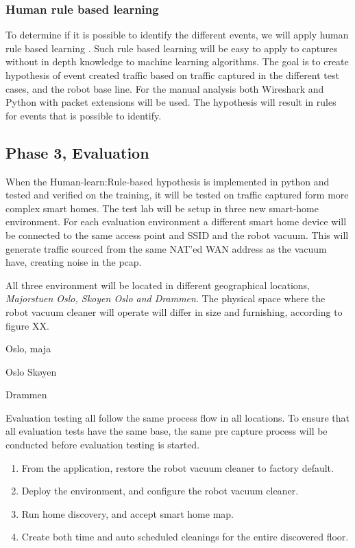 \subsubsection{Human rule based learning}
To determine if it is possible to identify the different events, we will apply human rule based learning \cite{Human-learn:Rule-based}. Such rule based learning will be easy to apply to captures without in depth knowledge to machine learning algorithms. The goal is to create hypothesis of event created traffic based on traffic captured in the different test cases, and the robot base line. For the manual analysis both Wireshark and Python with packet extensions will be used. The hypothesis will result in rules for events that is possible to identify.
 

\subsection{Phase 3, Evaluation }
When the Human-learn:Rule-based hypothesis is implemented in python and tested and verified on the training, it will be tested on traffic captured form more complex smart homes. The test lab will be setup in three new smart-home environment. For each evaluation environment a different smart home device will be connected to the same access point and SSID and the robot vacuum. This will generate traffic sourced from the same NAT'ed WAN address as the vacuum have, creating noise in the pcap.

All three environment will be located in different geographical locations, \textit{Majorstuen Oslo, Skoyen Oslo and Drammen}. The physical space where the robot vacuum cleaner will operate will differ in size and furnishing, according to figure XX. 

Oslo, maja 

Oslo Skøyen 

Drammen

Evaluation testing all follow the same process flow in all locations. To ensure that all evaluation tests have the same base, the same pre capture process will be conducted before evaluation testing is started. 

\begin{enumerate}
\item From the application, restore the robot vacuum cleaner to factory default. 
\item Deploy the environment, and configure the robot vacuum cleaner. 
\item Run home discovery, and accept smart home map.
\item Create both time and auto scheduled cleanings for the entire discovered floor.
\end{enumerate}

